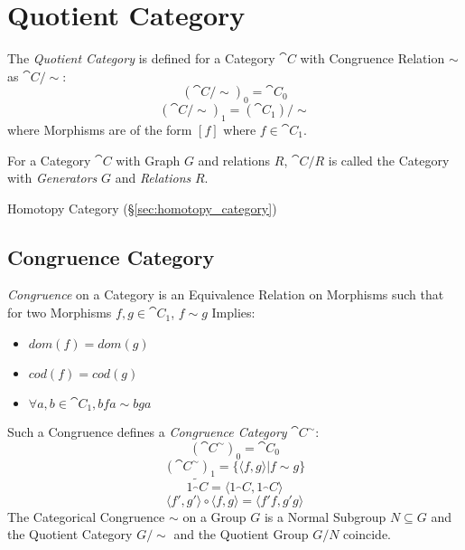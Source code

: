 \section{Quotient Category}\label{sec:quotient_category}


The \emph{Quotient Category} is defined for a Category $\cat{C}$
with Congruence Relation $\sim$ as $\cat{C}/\sim$:
\[
  (\cat{C}/\sim)_0 = \cat{C_0}
\]\[
  (\cat{C}/\sim)_1 = (\cat{C_1})/\sim
\]
where Morphisms are of the form $[f]$ where $f \in \cat{C_1}$.

For a Category $\cat{C}$ with Graph $G$ and relations $R$,
$\cat{C}/R$ is called the Category with \emph{Generators} $G$ and
\emph{Relations} $R$.

Homotopy Category (\S\ref{sec:homotopy_category})



\subsection{Congruence Category}\label{sec:congruence_category}

\emph{Congruence} on a Category is an Equivalence Relation on
Morphisms such that for two Morphisms $f,g \in \cat{C_1}$, $f \sim
g$ Implies:
\begin{itemize}
  \item $dom(f) = dom(g)$
  \item $cod(f) = cod(g)$
  \item $\forall a,b \in \cat{C_1}, bfa \sim bga$
\end{itemize}
Such a Congruence defines a \emph{Congruence Category}
$\cat{C^{\sim}}$:
\[
  (\cat{C^{\sim}})_0 = \cat{C}_0
\]\[
  (\cat{C^{\sim}})_1 = \{\langle f,g \rangle | f \sim g\}
\]\[
  \tilde{1_\cat{C}} = \langle 1_\cat{C}, 1_\cat{C} \rangle
\]\[
  \langle f',g' \rangle \circ \langle f,g \rangle = \langle f'f,g'g \rangle
\]
The Categorical Congruence $\sim$ on a Group $G$ is a Normal Subgroup
$N \subseteq G$ and the Quotient Category $G/\sim$ and the Quotient
Group $G/N$ coincide. \cite{awodey06}



